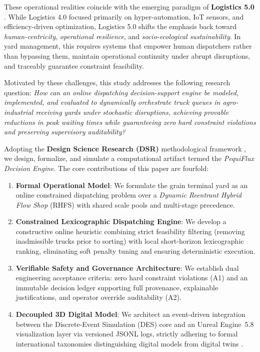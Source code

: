 \documentclass[11pt,a4paper]{article}
\begin{document}
These operational realities coincide with the emerging paradigm of \textbf{Logistics 5.0} \parencite{dasilvaIntegrationMachineLearning2023, torbaliMultiagentbasedRealtimeTruck2023}. While Logistics 4.0 focused primarily on hyper-automation, IoT sensors, and efficiency-driven optimization, Logistics 5.0 shifts the emphasis back toward \emph{human-centricity}, \emph{operational resilience}, and \emph{socio-ecological sustainability}. In yard management, this requires systems that empower human dispatchers rather than bypassing them, maintain operational continuity under abrupt disruptions, and traceably guarantee constraint feasibility.

Motivated by these challenges, this study addresses the following research question: \emph{How can an online dispatching decision-support engine be modeled, implemented, and evaluated to dynamically orchestrate truck queues in agro-industrial receiving yards under stochastic disruptions, achieving provable reductions in peak waiting times while guaranteeing zero hard constraint violations and preserving supervisory auditability?}

Adopting the \textbf{Design Science Research (DSR)} methodological framework \parencite{hevnerDesignScienceInformation2004a, peffersDesignScienceResearch2007aa}, we design, formalize, and simulate a computational artifact termed the \emph{PequiFlux Decision Engine}. The core contributions of this paper are fourfold:
\begin{enumerate}[leftmargin=1.2cm,itemsep=0pt,topsep=2pt]
  \item \textbf{Formal Operational Model}: We formulate the grain terminal yard as an online constrained dispatching problem over a \emph{Dynamic Reentrant Hybrid Flow Shop} (RHFS) with shared scale pools and multi-stage precedence.
  \item \textbf{Constrained Lexicographic Dispatching Engine}: We develop a constructive online heuristic combining strict feasibility filtering (removing inadmissible trucks prior to sorting) with local short-horizon lexicographic ranking, eliminating soft penalty tuning and ensuring deterministic execution.
  \item \textbf{Verifiable Safety and Governance Architecture}: We establish dual engineering acceptance criteria: zero hard constraint violations (A1) and an immutable decision ledger supporting full provenance, explainable justifications, and operator override auditability (A2).
  \item \textbf{Decoupled 3D Digital Model}: We architect an event-driven integration between the Discrete-Event Simulation (DES) core and an Unreal Engine~5.8 visualization layer via versioned JSONL logs, strictly adhering to formal international taxonomies distinguishing digital models from digital twins \parencite{kritzingerDigitalTwinManufacturing2018, nistDigitalTwinsEssentialElements2026}.
\end{enumerate}
\end{document}
